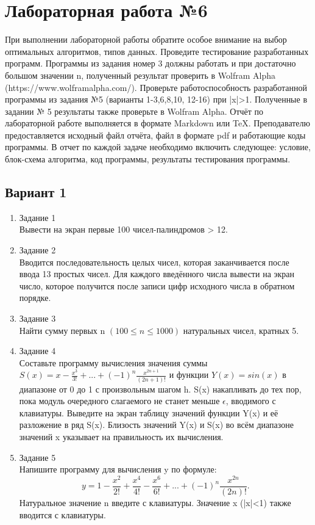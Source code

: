 \documentclass[a4paper]{article}
\begin{document}
\section*{Лабораторная работа №6}

	При выполнении лабораторной работы обратите особое внимание на выбор оптимальных алгоритмов, типов данных. Проведите тестирование разработанных программ. Программы из задания номер 3 должны работать и при достаточно большом значении n, полученный результат проверить в Wolfram Alpha (https://www.wolframalpha.com/). Проверьте работоспособность разработанной программы из задания №5 (варианты 1-3,6,8,10, 12-16) при |x|>1. Полученные в задании № 5 результаты также проверьте в Wolfram Alpha.
	Отчёт по лабораторной работе выполняется в формате Markdown или TeX. Преподавателю предоставляется исходный файл отчёта, файл в формате pdf и работающие коды программы. В отчет по каждой задаче необходимо включить следующее: условие, блок-схема алгоритма, код программы, результаты тестирования программы.
\newpage
	\begin{center}
		
		\subsection*{Вариант 1}
	\end{center}


	\begin{enumerate} 
		\item Задание 1 \\ 
			Вывести на экран первые 100 чисел-палиндромов > 12.
		\item Задание 2\\
			Вводится последовательность целых чисел, которая заканчивается после ввода 13 простых чисел. 
			Для каждого введённого числа вывести на экран число, 
			которое получится после записи цифр исходного числа в обратном порядке.\\
		\item Задание 3 \\
			Найти сумму первых n  $( 100 \le n \le 1000) $ натуральных чисел, кратных 5.\\
		\item Задание 4 \\
			Составьте программу вычисления значения суммы  $S(x)=x-\frac{x^3}{3!}+...+(-1)^n\frac{x^{2n+1}}{(2n+1)!}$
			и функции $Y(x)=sin(x)$ в диапазоне от 0 до 1
			с произвольным шагом h. S(x) накапливать до тех пор, пока модуль очередного слагаемого не станет меньше $\epsilon$, вводимого с клавиатуры. Выведите на экран таблицу значений функции Y(x) и её разложение в ряд S(x). Близость значений Y(x) и S(x) во всём диапазоне
			значений x указывает на правильность их вычисления.\\
		\item Задание 5 \\
			Напишите программу для вычисления y по формуле:
			$$y=1-\frac{x^2}{2!}+\frac{x^4}{4!}-\frac{x^6}{6!}+...+(-1)^n \frac{x^{2n}}{(2n)!}.$$
			Натуральное значение n введите с клавиатуры. Значение x (|x|<1) также вводится с клавиатуры.\\
	\end{enumerate}
\end{document}
